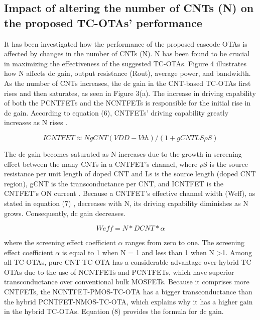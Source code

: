 \subsection*{Impact of altering the number of CNTs (N) on the proposed TC-OTAs' performance}

It has been investigated how the performance of the proposed cascode OTAs is
affected by changes in the number of CNTs (N). N has been found to be crucial in
maximizing the effectiveness of the suggested TC-OTAs. Figure 4 illustrates how
N affects dc gain, output resistance (Rout), average power, and bandwidth. As
the number of CNTs increases, the dc gain in the CNT-based TC-OTAs first rises
and then saturates, as seen in Figure 3(a). The increase in driving capability
of both the PCNTFETs and the NCNTFETs is responsible for the initial rise in dc
gain. According to equation (6), CNTFETs' driving capability greatly increases
as N rises \cite{ref7,ref24,ref25}.

\begin{equation}
  ICNTFET≈NgCNT(VDD-Vth)/(1+gCNTLSρS)
  \label{eq:6}
\end{equation}

The dc gain becomes saturated as N increases due to the growth in screening
effect between the many CNTs in a CNTFET's channel, where $\rho$S is the source
resistance per unit length of doped CNT and Ls is the source length (doped CNT
region), gCNT is the transconductance per CNT, and ICNTFET is the CNTFET’s ON
current \cite{ref13,ref14,ref15,ref16,ref17,ref18,ref30}. Because a CNTFET's
effective channel width (Weff), as stated in equation (7) \cite{ref33},
decreases with N, its driving capability diminishes as N grows. Consequently, dc
gain decreases.

\begin{equation}
  Weff = N*DCNT* α
  \label{eq:7}
\end{equation}

where the screening effect coefficient $\alpha$ ranges from zero to one. The
screening effect coefficient $\alpha$ is equal to 1 when N = 1 and less than 1
when N \textgreater 1. Among all TC-OTAs, pure CNT-TC-OTA has a considerable
advantage over hybrid TC-OTAs due to the use of NCNTFETs and PCNTFETs, which
have superior transconductance over conventional bulk MOSFETs. Because it
comprises more CNTFETs, the NCNTFET-PMOS-TC-OTA has a bigger transconductance
than the hybrid PCNTFET-NMOS-TC-OTA, which explains why it has a higher gain in
the hybrid TC-OTAs. Equation (8) provides the formula for dc gain.

